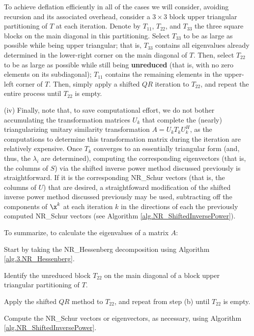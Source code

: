To achieve deflation efficiently in all of the cases we will consider, avoiding recursion and its associated overhead,
consider a $3\times 3$ block upper triangular partitioning of $T$ at each iteration.
Denote by $T_{11}$, $T_{22}$, and $T_{33}$ the three square blocks on the main diagonal in
this partitioning.  Select $T_{33}$ to be as large as possible
while being upper triangular; that is, $T_{33}$ contains all eigenvalues already determined
in the lower-right corner on the main diagonal of $T$.  Then, select $T_{22}$
to be as large as possible while still being {\bf unreduced} (that is, with
no zero elements on its subdiagonal); $T_{11}$ contains the remaining elements in the upper-left corner of $T$.
Then, simply apply a shifted $QR$ iteration to $T_{22}$, and repeat the entire process until $T_{22}$ is empty.\label{par:T22isolation}\vskip0.1in

\noindent (iv)
Finally, note that, to save computational effort, we do not bother accumulating the transformation matrices $U_k$ that
complete the (nearly) triangularizing unitary similarity transformation $A=U_k T_k U_k^H$, as the computations to determine this transformation matrix
during the iteration are relatively expensive.  
Once $T_k$ converges to an essentially triangular form (and, thus, the $\lambda_i$ are determined), computing the corresponding eigenvectors (that is, the columns of $S$) via the shifted inverse power method discussed previously is straightforward.
If it is the corresponding NR_Schur vectors (that is, the columns of $U$) that are desired, a straightfoward modification of the shifted inverse power method discussed previously may be used,
subtracting off the components of $\x^{k}$ at each iteration $k$ in the directions of each the previously computed NR_Schur vectors (see Algorithm \ref{alg.NR_ShiftedInversePower}). \vskip0.08in

\noindent To summarize, to calculate the eigenvalues of a matrix $A$:
\beginmylistb
\item[(a)] Start by taking the NR_Hessenberg decomposition using Algorithm \ref{alg.3.NR_Hessenberg}.
\item[(b)] Identify the unreduced block $T_{22}$ on the main diagonal of a block upper triangular partitioning of $T$.
\item[(c)] Apply the shifted $QR$ method to $T_{22}$, and repeat from step (b) until $T_{22}$ is empty. 
\item[(d)] Compute the NR_Schur vectors or eigenvectors, as necessary, using Algorithm \ref{alg.NR_ShiftedInversePower}.
\endmylist \vskip0.08in

